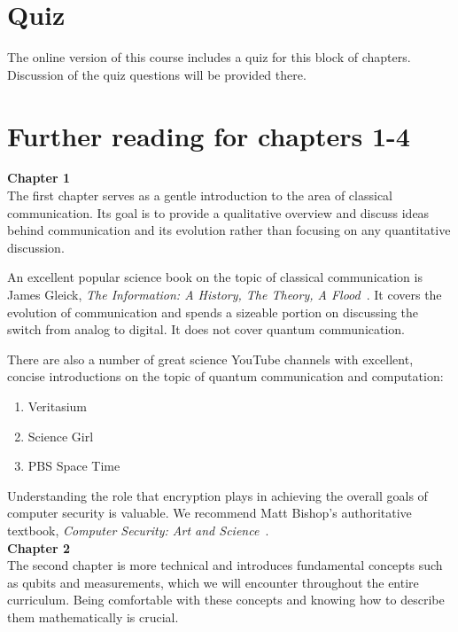 \newpage
\section*{Quiz}

The online version of this course includes a quiz for this block of chapters. Discussion of the quiz questions will be provided there.

\section*{Further reading for chapters 1-4}

\textbf{Chapter 1}\\

The first chapter serves as a gentle introduction to the area of classical communication. Its goal is to provide a qualitative overview and discuss ideas behind communication and its evolution rather than focusing on any quantitative discussion.

An excellent popular science book on the topic of classical communication is James Gleick, \emph{The Information: A History, The Theory, A Flood}~\cite{gleick2012information}. It covers the evolution of communication and spends a sizeable portion on discussing the switch from analog to digital. It does not cover quantum communication.

There are also a number of great science YouTube channels with excellent, concise introductions on the topic of quantum communication and computation:
\begin{enumerate}
    \item Veritasium
    \item Science Girl
    \item PBS Space Time
\end{enumerate}

Understanding the role that encryption plays in achieving the overall goals of computer security is valuable. We recommend Matt Bishop's authoritative textbook, \emph{Computer Security: Art and Science}~\cite{bishop2002art}. \\

\textbf{Chapter 2}\\

The second chapter is more technical and introduces fundamental concepts such as qubits and measurements, which we will encounter throughout the entire curriculum. Being comfortable with these concepts and knowing how to describe them mathematically is crucial.

